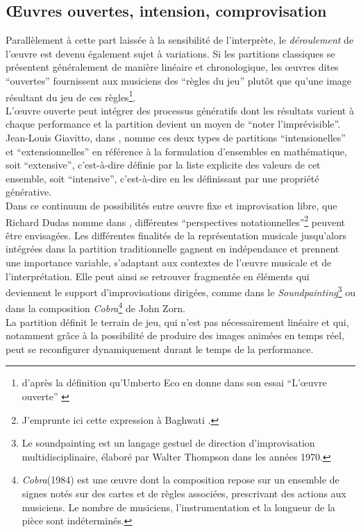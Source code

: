 \subsection{Œuvres ouvertes, intension, comprovisation}

\noindent Parallèlement à cette part laissée à la sensibilité de l'interprète, le \textit{déroulement} de l'œuvre est devenu également sujet à variations. Si les partitions classiques se présentent généralement de manière linéaire et chronologique, les œuvres dites ``ouvertes'' fournissent aux musiciens des ``règles du jeu'' plutôt que qu'une image résultant du jeu de ces règles\footnote{d'après la définition qu'Umberto Eco en donne dans son essai ``L'œuvre ouverte'' \cite{eco_oeuvre_2015}}.\\
\indent L'œuvre ouverte peut intégrer des processus génératifs dont les résultats varient à chaque performance et la partition devient un moyen de ``noter l'imprévisible''\cite{rebelo_notating_2010}. Jean-Louis Giavitto, dans \cite{giavitto_du_2014}, nomme ces deux types de partitions ``intensionelles'' et ``extensionnelles'' en référence à la formulation d'ensembles en mathématique, soit ``extensive'', c'est-à-dire définie par la liste explicite des valeurs de cet ensemble, soit ``intensive'', c'est-à-dire en les définissant par une propriété générative.\\
\indent Dans ce continuum de possibilités entre œuvre fixe et improvisation libre, que Richard Dudas nomme  dans \cite{dudas_comprovisation:_2010}, différentes ``perspectives notationnelles''\footnote{J'emprunte ici cette expression à Baghwati \cite{bhagwati_notational_2013}.} peuvent être envisagées. Les différentes finalités de la représentation musicale jusqu'alors intégrées dans la partition traditionnelle gagnent en indépendance et prennent une importance variable, s'adaptant aux contextes de l'œuvre musicale et de l'interprétation. Elle peut ainsi se retrouver fragmentée en éléments qui deviennent le support d'improvisations dirigées, comme dans le \textit{Soundpainting}\footnote{Le soundpainting est un langage gestuel de direction d'improvisation multidisciplinaire, élaboré par Walter Thompson dans les années 1970.} ou dans la composition \textit{Cobra}\footnote{\textit{Cobra}(1984) est une œuvre dont la composition repose sur un ensemble de signes notés sur des cartes et de règles associées, prescrivant des actions aux musiciens. Le nombre de musiciens, l'instrumentation et la longueur de la pièce sont indéterminés.} de John Zorn.\\
\indent La partition définit le terrain de jeu, qui n'est pas nécessairement linéaire et qui, notamment grâce à la possibilité de produire des images animées en temps réel, peut se reconfigurer dynamiquement durant le temps de la performance.

